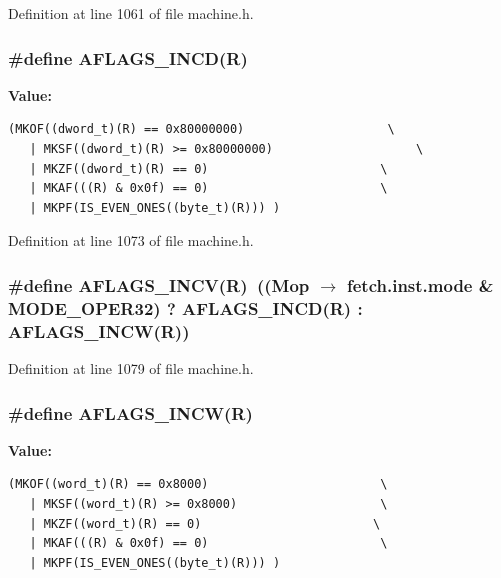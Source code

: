 Definition at line 1061 of file machine.h.
\subsubsection[{AFLAGS\_\-INCD}]{\setlength{\rightskip}{0pt plus 5cm}\#define AFLAGS\_\-INCD(R)}\label{machine_8h_9528872c7f04190115a9150242d626d6}


\textbf{Value:}

\begin{Code}\begin{verbatim}(MKOF((dword_t)(R) == 0x80000000)                    \
   | MKSF((dword_t)(R) >= 0x80000000)                    \
   | MKZF((dword_t)(R) == 0)                        \
   | MKAF(((R) & 0x0f) == 0)                        \
   | MKPF(IS_EVEN_ONES((byte_t)(R))) )
\end{verbatim}
\end{Code}


Definition at line 1073 of file machine.h.
\subsubsection[{AFLAGS\_\-INCV}]{\setlength{\rightskip}{0pt plus 5cm}\#define AFLAGS\_\-INCV(R)~((Mop $\rightarrow$ fetch.inst.mode \& MODE\_\-OPER32) ? AFLAGS\_\-INCD(R) : AFLAGS\_\-INCW(R))}\label{machine_8h_8c13b174d6cadab55674636f165161e6}




Definition at line 1079 of file machine.h.
\subsubsection[{AFLAGS\_\-INCW}]{\setlength{\rightskip}{0pt plus 5cm}\#define AFLAGS\_\-INCW(R)}\label{machine_8h_c84da5d0d4127747b32bfd0ed17d874b}


\textbf{Value:}

\begin{Code}\begin{verbatim}(MKOF((word_t)(R) == 0x8000)                        \
   | MKSF((word_t)(R) >= 0x8000)                    \
   | MKZF((word_t)(R) == 0)                        \
   | MKAF(((R) & 0x0f) == 0)                        \
   | MKPF(IS_EVEN_ONES((byte_t)(R))) )
\end{verbatim}
\end{Code}


